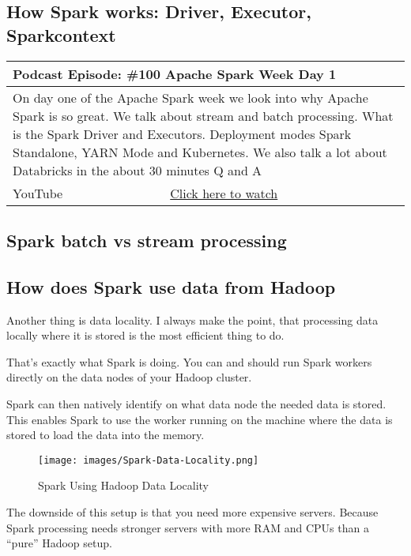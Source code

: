 \documentclass[12pt, numbers=noenddot]{scrreprt} %
\begin{document}
\subsection{How Spark works: Driver, Executor, Sparkcontext }

\begin{table}[h]
\begin{tabular}{ll}
\hline
\multicolumn{2}{l}{\textbf{Podcast Episode:} \#100 Apache Spark Week Day 1} \\ \hline
\multicolumn{2}{p{15cm}}{On day one of the Apache Spark week we look into why Apache Spark is so great. We talk about stream and batch processing. What is the Spark Driver and Executors. Deployment modes Spark Standalone, YARN Mode and Kubernetes. We also talk a lot about Databricks in the about 30 minutes Q and A}         \\ \hline
\multicolumn{1}{l|}{YouTube}   & \href{https://youtu.be/qD6Wi2pfCx0}{Click here to watch}   \\ \hline
\end{tabular}
\end{table}

\subsection{Spark batch vs stream processing}
\subsection{How does Spark use data from Hadoop}
Another thing is data locality. I always make the point, that processing data locally where it is stored is the most efficient thing to do.

That’s exactly what Spark is doing. You can and should run Spark workers directly on the data nodes of your Hadoop cluster.

Spark can then natively identify on what data node the needed data is stored. This enables Spark to use the worker running on the machine where the data is stored to load the data into the memory.

\begin{figure}[htbp]
  \centering
     \texttt{[image: images/Spark-Data-Locality.png]}
  \caption{Spark Using Hadoop Data Locality}
  \label{fig:Bild1}
\end{figure}

The downside of this setup is that you need more expensive servers. Because Spark processing needs stronger servers with more RAM and CPUs than a “pure” Hadoop setup.
\end{document}
